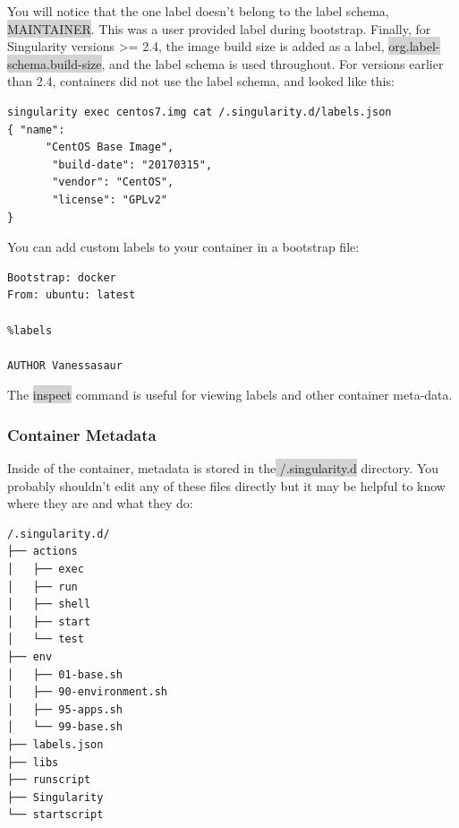 \documentclass[a4paper]{article}
\begin{document}
You will notice that the one label doesn’t belong to the label schema,  \colorbox{lightgray}{MAINTAINER}. This was a user provided label during bootstrap. Finally, for Singularity versions >= 2.4, the image build size is added as a label,  \colorbox{lightgray}{org.label-schema.build-size}, and the label schema is used throughout. For versions earlier than 2.4, containers did not use the label schema, and looked like this:

\begin{lstlisting}[frame=single] 
singularity exec centos7.img cat /.singularity.d/labels.json
{ "name": 
      "CentOS Base Image", 
       "build-date": "20170315", 
       "vendor": "CentOS", 
       "license": "GPLv2"
}
\end{lstlisting}

You can add custom labels to your container in a bootstrap file:

\begin{lstlisting}[frame=single] 
Bootstrap: docker
From: ubuntu: latest

%labels

AUTHOR Vanessasaur 
\end{lstlisting}

The \colorbox{lightgray}{inspect} command is useful for viewing labels and other container meta-data.

\subsubsection{Container Metadata}

Inside of the container, metadata is stored in the\colorbox{lightgray}{ /.singularity.d} directory. You probably shouldn’t edit any of these files directly but it may be helpful to know where they are and what they do:

\begin{lstlisting}[frame=single]  
/.singularity.d/
├── actions
│   ├── exec
│   ├── run
│   ├── shell
│   ├── start
│   └── test
├── env
│   ├── 01-base.sh
│   ├── 90-environment.sh
│   ├── 95-apps.sh
│   └── 99-base.sh
├── labels.json
├── libs
├── runscript
├── Singularity
└── startscript
\end{lstlisting}
\end{document}

